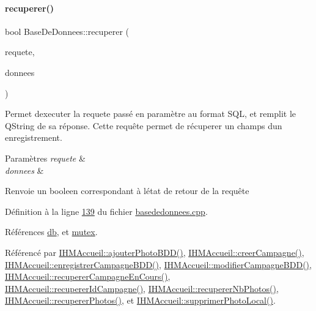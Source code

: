 \paragraph{\texorpdfstring{recuperer()}{recuperer()}\hspace{0.1cm}{\footnotesize\ttfamily [1/4]}}
{\footnotesize\ttfamily bool Base\+De\+Donnees\+::recuperer (\begin{DoxyParamCaption}\item[{Q\+String}]{requete,  }\item[{Q\+String \&}]{donnees }\end{DoxyParamCaption})}



Permet d\textquotesingle{}executer la requete passé en paramètre au format S\+QL, et remplit le Q\+String de sa réponse. Cette requête permet de récuperer un champs d\textquotesingle{}un enregistrement. 


\begin{DoxyParams}{Paramètres}
{\em requete} & \\
\hline
{\em donnees} & \\
\hline
\end{DoxyParams}
\begin{DoxyReturn}{Renvoie}
un booleen correspondant à l\textquotesingle{}état de retour de la requête 
\end{DoxyReturn}


Définition à la ligne \hyperlink{basededonnees_8cpp_source_l00139}{139} du fichier \hyperlink{basededonnees_8cpp_source}{basededonnees.\+cpp}.



Références \hyperlink{basededonnees_8h_source_l00030}{db}, et \hyperlink{basededonnees_8h_source_l00031}{mutex}.



Référencé par \hyperlink{ihmaccueil_8cpp_source_l00313}{I\+H\+M\+Accueil\+::ajouter\+Photo\+B\+D\+D()}, \hyperlink{ihmaccueil_8cpp_source_l00339}{I\+H\+M\+Accueil\+::creer\+Campagne()}, \hyperlink{ihmaccueil_8cpp_source_l00273}{I\+H\+M\+Accueil\+::enregistrer\+Campagne\+B\+D\+D()}, \hyperlink{ihmaccueil_8cpp_source_l00295}{I\+H\+M\+Accueil\+::modifier\+Campagne\+B\+D\+D()}, \hyperlink{ihmaccueil_8cpp_source_l00120}{I\+H\+M\+Accueil\+::recuperer\+Campagne\+En\+Cours()}, \hyperlink{ihmaccueil_8cpp_source_l00205}{I\+H\+M\+Accueil\+::recuperer\+Id\+Campagne()}, \hyperlink{ihmaccueil_8cpp_source_l00115}{I\+H\+M\+Accueil\+::recuperer\+Nb\+Photos()}, \hyperlink{ihmaccueil_8cpp_source_l00125}{I\+H\+M\+Accueil\+::recuperer\+Photos()}, et \hyperlink{ihmaccueil_8cpp_source_l00224}{I\+H\+M\+Accueil\+::supprimer\+Photo\+Local()}.


